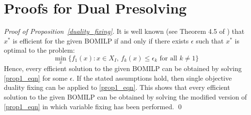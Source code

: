 \documentclass[11.5pt]{article}
\begin{document}





\appendix
\section{Proofs for Dual Presolving}\label{app:proofs}
\begin{proof}[Proof of Proposition~\ref{duality_fixing}] 
It is well known (see Theorem 4.5 of \citep{ehrgott2005multicriteria}) that $x^*$ is efficient for the given BOMILP if and only if there exists $\epsilon$ such that $x^*$ is optimal to the problem: 
\begin{equation}\label{prop1_eqn}
\min_{x} \{f_1(x)\colon x \in X_I,\, f_k(x) \leq \epsilon_k \text{ for all } k \neq 1\}
\end{equation}
Hence, every efficient solution to the given BOMILP can be obtained by solving \eqref{prop1_eqn} for some $\epsilon$. If the stated assumptions hold, then single objective duality fixing can be applied to \eqref{prop1_eqn}. This shows that every efficient solution to the given BOMILP can be obtained by solving the modified version of \eqref{prop1_eqn} in which variable fixing has been performed. \qed
\end{proof}
\end{document}

